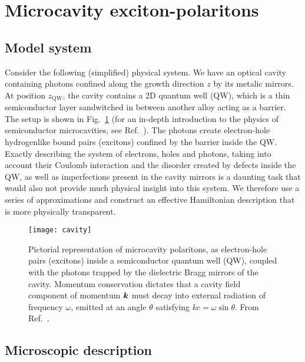 \section{Microcavity exciton-polaritons}
\label{sec:polaritons}


\subsection{Model system}
\label{subsec:model}



Consider the following (simplified) physical system. We have an
optical cavity containing photons confined along the growth direction
$z$ by its metalic mirrors. At position $z_{\text{QW}}$, the cavity
contains a 2D quantum well (QW), which is a thin semiconductor layer
sandwitched in between another alloy acting as a barrier. The setup is
shown in Fig.~\ref{fig:cavity-polaritons} (for an in-depth
introduction to the physics of semiconductor microcavities, see
Ref.~\cite{9780199228942}). The photons create electron-hole
hydrogenlike bound pairs (excitons) confined by the barrier inside the
QW. Exactly describing the system of electrons, holes and photons,
taking into account their Coulomb interaction and the disorder created
by defects inside the QW, as well as imperfections present in the
cavity mirrors is a daunting task that would also not provide much
physical insight into this system. We therefore use a series of
approximations and construct an effective Hamiltonian description that
is more physically transparent.
%
\begin{figure}[tb]\centering
  \texttt{[image: cavity]}
  \caption{
    Pictorial representation of microcavity polaritons, as electron-hole pairs (excitons) inside a semiconductor quantum well (QW), 
    coupled with the photons trapped by the dielectric Bragg mirrors of the cavity. 
    Momentum conservation dictates that a cavity field component of momentum $\bm{k}$ must decay into external radiation of frequency $\omega$, emitted at an angle $\theta$ satisfying $k c = \omega \sin\theta$.
    From Ref.~\cite{Kasprzak_2006}.
  }\label{fig:cavity-polaritons}
\end{figure}

\subsection{Microscopic description}
\label{subsec:microscopic}


